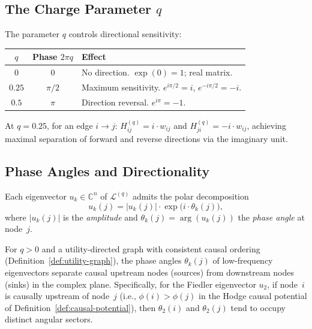 \documentclass[twoside,11pt]{article}
\newcommand{\C}{\mathbb{C}}
\begin{document}
\subsection{The Charge Parameter $q$}

The parameter $q$ controls directional sensitivity:

\begin{center}
\begin{tabular}{ccp{7cm}}
\toprule
$q$ & Phase $2\pi q$ & Effect \\
\midrule
$0$ & $0$ & No direction. $\exp(0)=1$; real matrix. \\
$0.25$ & $\pi/2$ & Maximum sensitivity.
  $e^{i\pi/2}=i$, $e^{-i\pi/2}=-i$. \\
$0.5$ & $\pi$ & Direction reversal. $e^{i\pi}=-1$. \\
\bottomrule
\end{tabular}
\end{center}

\begin{remark}
\label{rem:q-optimal}
At $q=0.25$, for an edge $i\to j$:
$H^{(q)}_{ij}=i\cdot w_{ij}$ and $H^{(q)}_{ji}=-i\cdot w_{ij}$,
achieving maximal separation of forward and reverse directions via the
imaginary unit.
\end{remark}

\subsection{Phase Angles and Directionality}

Each eigenvector $u_k\in\C^n$ of $\mathcal{L}^{(q)}$ admits the polar
decomposition
\[
  u_k(j) = |u_k(j)|\cdot\exp\!\bigl(i\cdot\theta_k(j)\bigr),
\]
where $|u_k(j)|$ is the \emph{amplitude} and
$\theta_k(j)=\arg(u_k(j))$ the \emph{phase angle} at node~$j$.

\begin{theorem}
\label{thm:phase-direction}
For $q>0$ and a utility-directed graph with consistent causal ordering
(Definition~\ref{def:utility-graph}), the phase angles $\theta_k(j)$ of
low-frequency eigenvectors separate causal upstream nodes (sources) from
downstream nodes (sinks) in the complex plane.  Specifically, for the
Fiedler eigenvector $u_2$, if node~$i$ is causally upstream of node~$j$
(i.e., $\phi(i)>\phi(j)$ in the Hodge causal potential of
Definition~\ref{def:causal-potential}), then $\theta_2(i)$ and
$\theta_2(j)$ tend to occupy distinct angular sectors.
\end{theorem}
\end{document}
